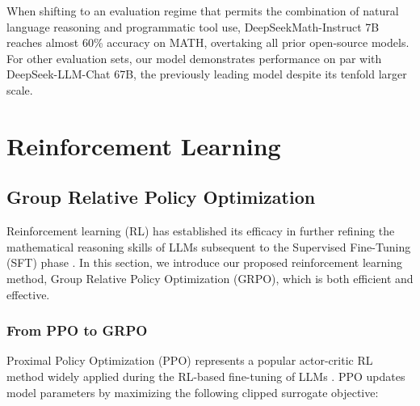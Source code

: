 When shifting to an evaluation regime that permits the combination of natural language reasoning and programmatic tool use, DeepSeekMath-Instruct 7B reaches almost 60\% accuracy on MATH, overtaking all prior open-source models. For other evaluation sets, our model demonstrates performance on par with DeepSeek-LLM-Chat 67B, the previously leading model despite its tenfold larger scale.

\section{Reinforcement Learning}

\subsection{Group Relative Policy Optimization}
Reinforcement learning (RL) has established its efficacy in further refining the mathematical reasoning skills of LLMs subsequent to the Supervised Fine-Tuning (SFT) phase \citep{wang2023math, wizardmath}. In this section, we introduce our proposed reinforcement learning method, Group Relative Policy Optimization (GRPO), which is both efficient and effective.

\subsubsection{From PPO to GRPO}
Proximal Policy Optimization (PPO) \citep{schulman2017proximal} represents a popular actor-critic RL method widely applied during the RL-based fine-tuning of LLMs \citep{ouyang2022training}. PPO updates model parameters by maximizing the following clipped surrogate objective:

